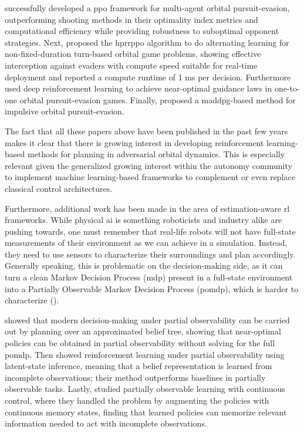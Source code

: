 \cite{li2025heterogeneousppo} successfully developed a \acs{ppo} framework for multi-agent orbital pursuit-evasion, outperforming shooting methods in their optimality index metrics and computational efficiency while providing robustness to suboptimal opponent strategies. Next, \cite{cao2026historyawareppo} proposed the \acs{hprrppo} algorithm to do alternating learning for non-fixed-duration turn-based orbital game problems, showing effective interception against evaders with compute speed suitable for real-time deployment and reported a compute runtime of 1 ms per decision. Furthermore \cite{zhang2022nearoptimal} used deep reinforcement learning to achieve near-optimal guidance laws in one-to-one orbital pursuit-evasion games. Finally, \cite{zhao2023prdmaddpg} proposed a \acs{maddpg}-based method for impulsive orbital pursuit-evasion.

The fact that all these papers above have been published in the past few years makes it clear
that there is growing interest in developing reinforcement learning-based methods for planning in adversarial orbital dynamics. This is especially relevant given the generalized growing interest within the autonomy community to implement machine learning-based frameworks to complement or even replace classical control architectures. 


Furthermore, additional work has been made in the area of estimation-aware \acs{rl} frameworks. While physical \acs{ai} is something roboticists and industry alike are pushing towards, one must remember that real-life robots will not have full-state measurements of their environment as we can achieve in a simulation. Instead, they need to use sensors to characterize their surroundings and plan accordingly. Generally speaking, this is problematic on the decision-making side, as it can turn a clean Markov Decision Process (\acs{mdp}) present in a full-state environment into a Partially Observable Markov Decision Process (\acs{pomdp}), which is harder to characterize (\cite{kaelbling1998pomdp}). 

\cite{ye2017despot} showed that modern decision-making under partial observability can be carried out by planning over an approximated belief tree, showing that near-optimal policies can be obtained in partial observability without solving for the full \acs{pomdp}. Then \cite{igl2018dvrl} showed reinforcement learning under partial observability using latent-state inference, meaning that a belief representation is learned from incomplete observations; their method outperforms baselines in partially observable tasks. Lastly, \cite{zhang2015continuousmemory} studied partially observable learning with continuous control, where they handled the problem by augmenting the policies with continuous memory states, finding that learned policies can memorize relevant information needed to act with incomplete observations.


